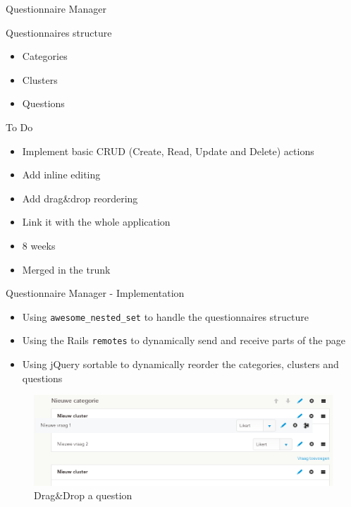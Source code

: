 \documentclass[10pt,a4paper]{beamer}
\begin{document}
\begin{frame}{Questionnaire Manager}
  \begin{block}{Questionnaires structure}
    \begin{itemize}
      \item Categories
      \item Clusters
      \item Questions 
    \end{itemize}
  \end{block}

  \begin{block}{To Do}
    \begin{itemize}
      \item Implement basic CRUD (Create, Read, Update and Delete) actions 
      \item Add inline editing
      \item Add drag\&drop reordering 
      \item Link it with the whole application
    \end{itemize}
  \end{block}
  
  \begin{block}{}
    \begin{itemize}
      \item 8 weeks
      \item Merged in the trunk
    \end{itemize}
  \end{block}
\end{frame}

\begin{frame}{Questionnaire Manager - Implementation}
  \begin{itemize}
    \item Using \texttt{awesome\_nested\_set} to handle the questionnaires structure
    \item Using the Rails \texttt{remotes} to dynamically send and receive parts of the page
    \item Using jQuery sortable to dynamically reorder the categories, clusters and questions
  \end{itemize}
  
  \begin{figure}[htp]
  \centering
  \includegraphics[scale=0.3]{../img/calibris_drag_drop.png}
   \caption{Drag\&Drop a question}
  \end{figure}
\end{frame}
\end{document}

